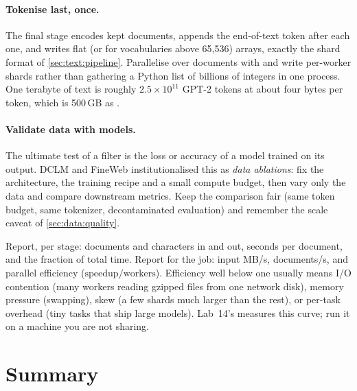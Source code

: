 \paragraph{Tokenise last, once.} The final stage encodes kept documents, appends the
end-of-text token after each one, and writes flat  (or  for vocabularies
above 65{,}536) arrays, exactly the shard format of \cref{sec:text:pipeline}. Parallelise over
documents with  and write per-worker shards rather than
gathering a Python list of billions of integers in one process. One terabyte of text is roughly
$2.5\times10^{11}$ GPT-2 tokens at about four bytes per token, which is 500\,GB as .

\paragraph{Validate data with models.} The ultimate test of a filter is the loss or accuracy of a
model trained on its output. DCLM and FineWeb institutionalised this as \emph{data ablations}:
fix the architecture, the training recipe and a small compute budget, then vary only the data
and compare downstream metrics. Keep the comparison fair (same token budget, same
tokenizer, decontaminated evaluation) and remember the scale caveat of \cref{sec:data:quality}.

\begin{systemslens}
Report, per stage: documents and characters in and out, seconds per document, and the fraction of
total time. Report for the job: input MB/s, documents/s, and parallel efficiency
($\text{speedup}/\text{workers}$). Efficiency well below one usually means I/O contention (many
workers reading gzipped files from one network disk), memory pressure (swapping), skew (a few
shards much larger than the rest), or per-task overhead (tiny tasks that ship large models). Lab~14's
 measures this curve; run it on a machine you are not sharing.
\end{systemslens}

\section{Summary}\label{sec:data:summary}

